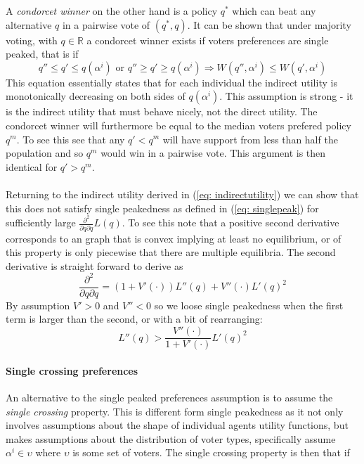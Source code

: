 A \textit{condorcet winner} on the other hand is a policy $q^*$ which can beat any alternative $q$ in a pairwise vote of $(q^*, q)$. It can be shown that under majority voting, with $q\in\mathbb{R}$ a condorcet winner exists if voters preferences are single peaked, that is if
\begin{equation}\label{eq: singlepeak}
  q'' \leq q' \leq q(\alpha^i) \text{ or } q'' \geq q' \geq q(\alpha^i) \Rightarrow W(q'', \alpha^i) \leq W(q', \alpha^i)
\end{equation}
This equation essentially states that for each individual the indirect utility is monotonically decreasing on both sides of $q(\alpha^i)$. This assumption is strong - it is the indirect utility that must behave nicely, not the direct utility. 
The condorcet winner will furthermore be equal to the median voters prefered policy $q^m$. To see this see that any $q'<q^m$ will have support from less than half the population and so $q^m$ would win in a pairwise vote. This argument is then identical for $q'>q^m$.
\\ \\ 
Returning to the indirect utility derived in (\ref{eq: indirectutility}) we can show that this does not satisfy single peakedness as defined in (\ref{eq: singlepeak}) for sufficiently large $\frac{\partial^2}{\partial q \partial q} L(q)$. To see this note that a positive second derivative corresponds to an graph that is convex implying at least no equilibrium, or of this property is only piecewise that there are multiple equilibria. The second derivative is straight forward to derive as 
\begin{equation}
\frac{\partial^2}{\partial q \partial q} = (1+V'(\cdot))L''(q) + V''(\cdot)L'(q)^2  
\end{equation}
By assumption $V'>0$ and $V''<0$ so we loose single peakedness when the first term is larger than the second, or with a bit of rearranging: 
\begin{equation}
  L''(q) > \frac{V''(\cdot)}{1 + V'(\cdot)} L'(q)^2
\end{equation}

\paragraph{Single crossing preferences} An alternative to the single peaked preferences assumption is to assume the \emph{single crossing} property. This is different form single peakedness as it not only involves assumptions about the shape of individual agents utility functions, but makes assumptions about the distribution of voter types, specifically assume $\alpha^i \in \upsilon$ where $\upsilon$ is some set of voters. The single crossing property is then that if

